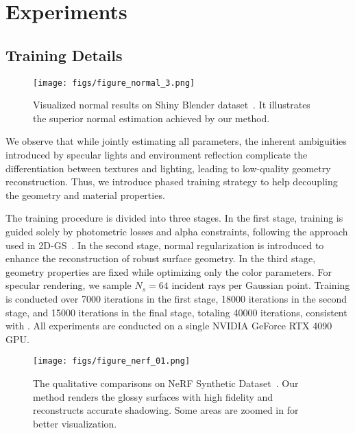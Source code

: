 \section{Experiments}
\label{sec:experiments}
\subsection{Training Details}
\label{sec:details}



\begin{figure}[b]
    \centering
    \texttt{[image: figs/figure\_normal\_3.png]}
    \caption{Visualized normal results on Shiny Blender dataset~\cite{verbin2022ref}. It illustrates the superior normal estimation achieved by our method. 
    }
    \label{fig:fig_shinyblender_normal}
          
\end{figure}




We observe that while jointly estimating all parameters, the inherent ambiguities introduced by specular lights and environment reflection complicate the differentiation between textures and lighting, leading to low-quality geometry reconstruction. Thus, we introduce phased training strategy to help decoupling the geometry and material properties. 

The training procedure is divided into three stages. In the first stage, training is guided solely by photometric losses and alpha constraints, following the approach used in 2D-GS~\cite{Huang2DGS2024}. In the second stage, normal regularization is introduced to enhance the reconstruction of robust surface geometry. In the third stage, geometry properties are fixed while optimizing only the color parameters. For specular rendering, we sample $N_s=64$ incident rays per Gaussian point. Training is conducted over 7000 iterations in the first stage, 18000 iterations in the second stage, and 15000 iterations in the final stage, totaling 40000 iterations, consistent with \cite{gao2023relightable}. All experiments are conducted on a single NVIDIA GeForce RTX 4090 GPU. 



\begin{figure*}[t]
    \centering
    \vspace{-3ex}
    \texttt{[image: figs/figure\_nerf\_01.png]}
    \caption{The qualitative comparisons on NeRF Synthetic Dataset~\cite{mildenhall2020nerf}. Our method renders the glossy surfaces with high fidelity and reconstructs accurate shadowing. Some areas are zoomed in for better visualization.
    }
    \label{fig:nerf_synthetic}
      \vspace{-3ex}
\end{figure*}

